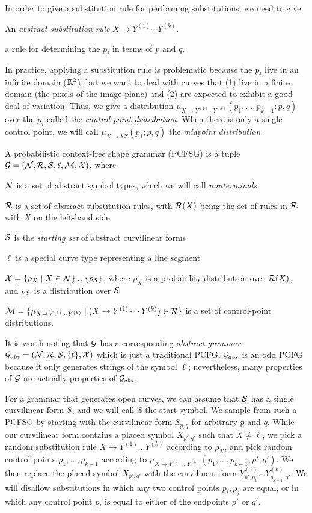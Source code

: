 In order to give a substitution rule for performing substitutions, we
need to give
\bitem
\item An {\em abstract substitution rule} $X\to Y^{(1)}\cdots Y^{(k)}$.
\item a rule for determining the $p_i$ in terms of $p$ and $q$.
\eitem

In practice, applying a substitution rule is problematic because the
$p_i$ live in an infinite domain ($\mathbb{R}^2$), but we want to deal with
curves that (1) live in a finite domain (the pixels of the image
plane) and (2) are expected to exhibit a good deal of variation. Thus,
we give a distribution $\mu_{X\to Y^{(1)}\cdots Y^{(k)}}(p_1,\dots,
p_{k-1} ; p,q)$ over the $p_i$ called the {\em control point distribution}. 
When there is only a single control point, we will call $\mu_{X\to
YZ}(p_1; p,q)$ the {\em midpoint distribution}.

\begin{defn}
A probabilistic context-free shape grammar (PCFSG) is a tuple 
${\mathcal G} = ({\mathcal N}, {\mathcal R}, {\mathcal S}, \ell, {\mathcal M}, {\mathcal X})$, where
\bitem
\item ${\mathcal N}$ is a set of abstract symbol types, which we will call
  {\em nonterminals}
\item ${\mathcal R}$ is a set of abstract substitution rules, with ${\mathcal R}(X)$
  being the set of rules in ${\mathcal R}$ with $X$ on the left-hand side
\item ${\mathcal S}$ is the {\em starting set} of abstract curvilinear forms
\item $\ell$ is a special curve type representing a line segment
\item ${\mathcal X} = \{ \rho_X \mid X\in {\mathcal N} \} \cup
  \{\rho_{\mathcal S}\}$, where $\rho_X$ is a probability distribution over
  ${\mathcal R}(X)$, and $\rho_{\mathcal S}$ is a distribution over ${\mathcal S}$
\item ${\mathcal M} = \{ \mu_{X\to Y^{(1)}\cdots Y^{(k)}} \mid (X\to
  Y^{(1)}\cdots Y^{(k)}) \in {\mathcal R}\}$ is a set of control-point
  distributions.
\eitem
\end{defn}

It is worth noting that ${\mathcal G}$ has a corresponding {\em abstract
  grammar} ${\mathcal G}_{abs} = ({\mathcal N}, {\mathcal R}, {\mathcal S}, \{\ell\}, {\mathcal X})$ which is
just a traditional PCFG. ${\mathcal G}_{abs}$ is an odd PCFG because it only
generates strings of the symbol $\ell$; nevertheless, many properties
of ${\mathcal G}$ are actually properties of ${\mathcal G}_{abs}$.

For a grammar that generates open curves, we can assume that ${\mathcal S}$
has a single curvilinear form $S$, and we will call $S$ the start
symbol. We sample from such a PCFSG by starting with the curvilinear
form $S_{p,q}$ for arbitrary $p$ and $q$. While our curvilinear form
contains a placed symbol $X_{p',q'}$ such that $X\ne \ell$, we pick a
random substitution rule $X \to Y^{(1)} \dots Y^{(k)}$ according to
$\rho_X$, and pick random control points $p_1,\dots, p_{k-1}$
according to $\mu_{X\to Y^{(1)}\dots Y^{(k)}}(p_1, \dots, p_{k-1}; p',
q')$. We then replace the placed symbol $X_{p',q'}$ with the
curvilinear form $Y_{p',p_1}^{(1)} \dots Y_{p_{k-1},q'}^{(k)}$. We
will disallow substitutions in which any two control points $p_i, p_j$
are equal, or in which any control point $p_i$ is equal to either of
the endpoints $p'$ or $q'$.

